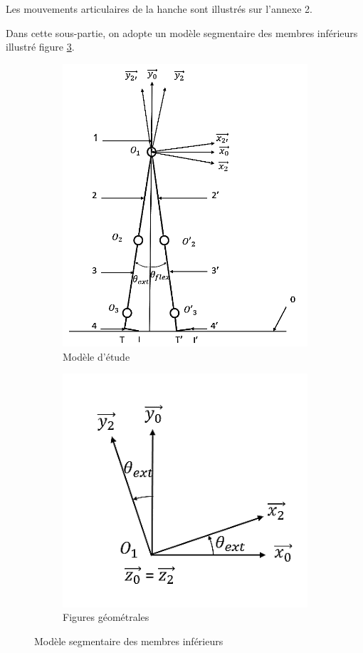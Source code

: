 Les mouvements articulaires de la hanche sont illustrés sur l'annexe 2.

Dans cette sous-partie, on adopte un modèle segmentaire des membres inférieurs illustré figure \ref{fig07}.

\begin{figure}[ht!]
    \begin{subfigure}[b]{0.45\textwidth}
      \centering\includegraphics[width=.7\textwidth]{img/fig07a}
      \caption{\label{fig07a} Modèle d'étude}
    \end{subfigure}
    \hfill
    \begin{subfigure}[b]{0.45\textwidth}
      \centering\includegraphics[width=.7\textwidth]{img/fig07b}
      \caption{\label{fig07b} Figures géométrales}
    \end{subfigure}
    \caption{\label{fig07} Modèle segmentaire des membres inférieurs}
\end{figure}
  
